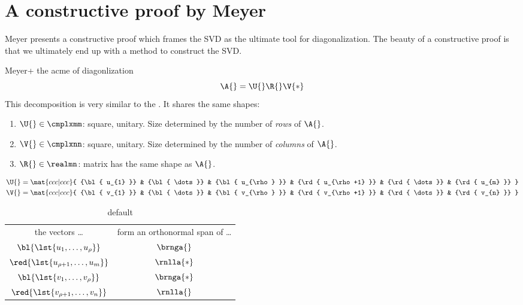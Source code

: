 \section{A constructive proof by Meyer}

Meyer presents a constructive proof \cite[\S 5.12]{Meyer2000} which frames the SVD as the ultimate tool for diagonalization. 
The beauty of a constructive proof is that we ultimately end up with a method to construct the SVD.  

Meyer+ the acme of diagonlization
\begin{equation}
  \A{} = \U{} \R{} \V{*}
\end{equation}
This decomposition is very similar to the \asvd. It shares the same shapes:
%
\begin{enumerate}
\item $\U{}\in\cmplxmm$: square, unitary. Size determined by the number of \emph{rows} of $\A{}$.
\item $\V{}\in\cmplxnn$: square, unitary. Size determined by the number of \emph{columns} of $\A{}$.
\item $\R{}\in\realmn$: matrix has the same shape as $\A{}$.
\end{enumerate}
%
\begin{equation}
  \begin{split}
    \U{} & = \mat{ccc|ccc}{ {\bl{ u_{1} }} & {\bl{ \dots }} & {\bl{ u_{\rho} }} & {\rd{ u_{\rho+1} }} & {\rd{ \dots }} & {\rd{ u_{m} }} } \\
    \V{} & = \mat{ccc|ccc}{ {\bl{ v_{1} }} & {\bl{ \dots }} & {\bl{ v_{\rho} }} & {\rd{ v_{\rho+1} }} & {\rd{ \dots }} & {\rd{ v_{n} }} }
  \end{split}
\end{equation}
\begin{table}[htdp]
\caption{default}
\begin{center}
\begin{tabular}{cc}
%
 the vectors \dots & form an orthonormal span of \dots \\
%
 ${\bl{ \lst{u_{1},\dots,u_{\rho}} }}$ & $\brnga{}$ \\
%
 ${\red{ \lst{u_{\rho+1},\dots,u_{m}} }}$ & $\rnlla{*}$ \\
%
 ${\bl{ \lst{v_{1},\dots,v_{\rho}} }}$ & $\brnga{*}$ \\
%
 ${\red{ \lst{v_{\rho+1},\dots,v_{n}} }}$ & $\rnlla{}$ \\
%
\end{tabular}
\end{center}
\label{default}
\end{table}%


